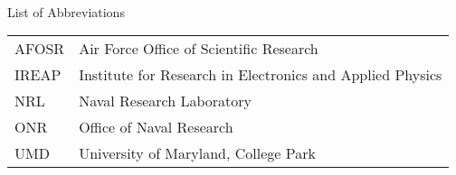 
\clearpage{}
{}

\renewcommand{\baselinestretch}{1}
\small\normalsize
\hbox{\ }

\vspace{5em}

\begin{center}
\large{List of Abbreviations}
\end{center} 

\vspace{3pt}

\begin{supertabular}{ll}
AFOSR & Air Force Office of Scientific Research \\
IREAP & Institute for Research in Electronics and Applied Physics \\
NRL & Naval Research Laboratory \\
ONR & Office of Naval Research \\
UMD & University of Maryland, College Park \\
\end{supertabular}
